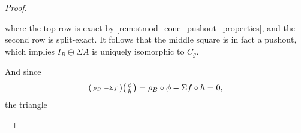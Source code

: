 \begin{proof}
\begin{enumerate}[label={(\bfseries TR\arabic*)}]
{\begin{center}
            \end{center}
            where the top row is exact by \autoref{rem:stmod_cone_pushout_properties}, and the second row is split-exact. It follows that the middle square is in fact a pushout, which implies \( I_B \oplus \Sigma A  \) is uniquely isomorphic to \( C_g \). %
            
            And since
            \[
                \begin{psmallmatrix}
                    \rho_B & -\Sigma f
                \end{psmallmatrix}
                \begin{psmallmatrix}
                    \phi \\
                    h
                \end{psmallmatrix}
                =
                \rho_B \circ \phi - \Sigma f \circ h = 0,
            \]
            the triangle
            \begin{center}
\end{center}}
\end{enumerate}
\end{proof}
